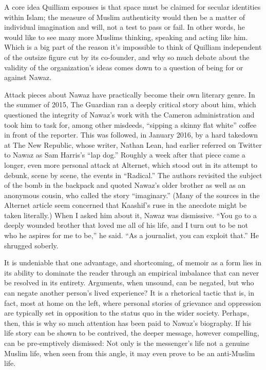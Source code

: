 A core idea Quilliam espouses is that space must be claimed for secular
identities within Islam; the measure of Muslim authenticity would then
be a matter of individual imagination and will, not a test to pass or
fail. In other words, he would like to see many more Muslims thinking,
speaking and acting like him. Which is a big part of the reason it's
impossible to think of Quilliam independent of the outsize figure cut by
its co-founder, and why so much debate about the validity of the
organization's ideas comes down to a question of being for or against
Nawaz.

Attack pieces about Nawaz have practically become their own literary
genre. In the summer of 2015, The Guardian ran a deeply critical story
about him, which questioned the integrity of Nawaz's work with the
Cameron administration and took him to task for, among other misdeeds,
``sipping a skinny flat white'' coffee in front of the reporter. This
was followed, in January 2016, by a hard takedown at The New Republic,
whose writer, Nathan Lean, had earlier referred on Twitter to Nawaz as
Sam Harris's ``lap dog.'' Roughly a week after that piece came a longer,
even more personal attack at Alternet, which stood out in its attempt to
debunk, scene by scene, the events in ``Radical.'' The authors revisited
the subject of the bomb in the backpack and quoted Nawaz's older brother
as well as an anonymous cousin, who called the story ``imaginary.''
(Many of the sources in the Alternet article seem concerned that
Kaashif's ruse in the anecdote might be taken literally.) When I asked
him about it, Nawaz was dismissive. ``You go to a deeply wounded brother
that loved me all of his life, and I turn out to be not who he aspires
for me to be,'' he said. ``As a journalist, you can exploit that.'' He
shrugged soberly.

It is undeniable that one advantage, and shortcoming, of memoir as a
form lies in its ability to dominate the reader through an empirical
imbalance that can never be resolved in its entirety. Arguments, when
unsound, can be negated, but who can negate another person's lived
experience? It is a rhetorical tactic that is, in fact, most at home on
the left, where personal stories of grievance and oppression are
typically set in opposition to the status quo in the wider society.
Perhaps, then, this is why so much attention has been paid to Nawaz's
biography. If his life story can be shown to be contrived, the deeper
message, however compelling, can be pre-emptively dismissed: Not only is
the messenger's life not a genuine Muslim life, when seen from this
angle, it may even prove to be an anti-Muslim life.

